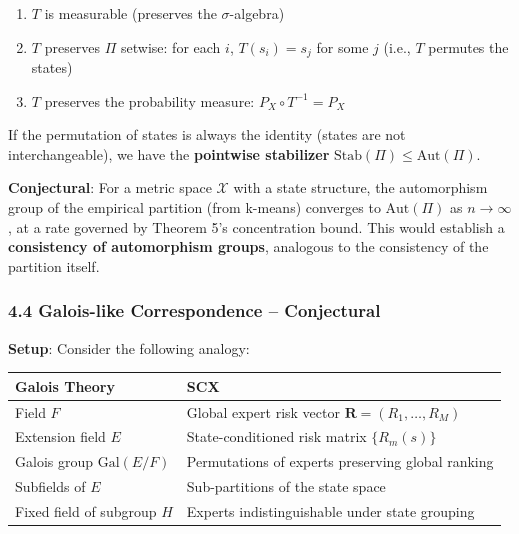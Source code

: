 \documentclass[
  12pt,
]{article}
\providecommand{\tightlist}{%
  \setlength{\itemsep}{0pt}\setlength{\parskip}{0pt}}
\begin{document}
\begin{enumerate}
\def\labelenumi{\arabic{enumi}.}
\tightlist
\item
  \(T\) is measurable (preserves the \(\sigma\)-algebra)
\item
  \(T\) preserves \(\Pi\) setwise: for each \(i\), \(T(s_i) = s_j\) for
  some \(j\) (i.e., \(T\) permutes the states)
\item
  \(T\) preserves the probability measure: \(P_X \circ T^{-1} = P_X\)
\end{enumerate}

If the permutation of states is always the identity (states are not
interchangeable), we have the \textbf{pointwise stabilizer}
\(\text{Stab}(\Pi) \leq \text{Aut}(\Pi)\).

\textbf{Conjectural}: For a metric space \(\mathcal{X}\) with a state
structure, the automorphism group of the empirical partition (from
k-means) converges to \(\text{Aut}(\Pi)\) as \(n \to \infty\), at a rate
governed by Theorem 5's concentration bound. This would establish a
\textbf{consistency of automorphism groups}, analogous to the
consistency of the partition itself.

\subsubsection{4.4 Galois-like Correspondence --
Conjectural}\label{galois-like-correspondence-conjectural}

\textbf{Setup}: Consider the following analogy:

\begin{longtable}[]{@{}
  >{\raggedright\arraybackslash}p{}
  >{\raggedright\arraybackslash}p{}@{}}
\toprule\noalign{}
\begin{minipage}[b]{\linewidth}\raggedright
Galois Theory
\end{minipage} & \begin{minipage}[b]{\linewidth}\raggedright
SCX
\end{minipage} \\
\midrule\noalign{}
\endhead
\bottomrule\noalign{}
\endlastfoot
Field \(F\) & Global expert risk vector
\(\mathbf{R} = (R_1, \dots, R_M)\) \\
Extension field \(E\) & State-conditioned risk matrix \(\{R_m(s)\}\) \\
Galois group \(\text{Gal}(E/F)\) & Permutations of experts preserving
global ranking \\
Subfields of \(E\) & Sub-partitions of the state space \\
Fixed field of subgroup \(H\) & Experts indistinguishable under state
grouping \\
\end{longtable}
\end{document}
